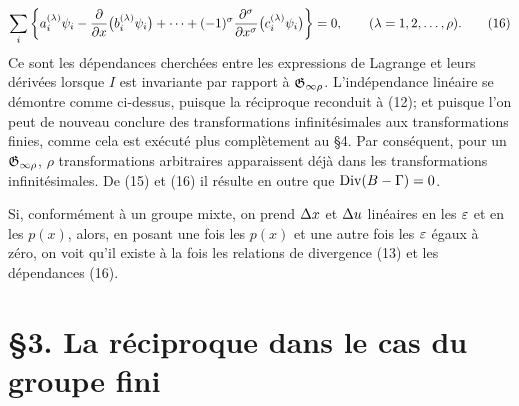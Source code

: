 \begin{equation}
\sum_i\left\{
a_i^{(\lambda)}\psi_i-\frac{\partial}{\partial x}\bigl(b_i^{(\lambda)}\psi_i\bigr)
+\cdots+(-1)^\sigma
\frac{\partial^\sigma}{\partial x^\sigma}\bigl(c_i^{(\lambda)}\psi_i\bigr)
\right\}=0,\qquad(\lambda=1,2,\ldots,\rho).
\tag{16}
\end{equation}
Ce sont les dépendances cherchées entre les expressions de Lagrange et leurs dérivées lorsque \(I\) est invariante par rapport à \(\mathfrak G_{\infty\rho}\). L'indépendance linéaire se démontre comme ci-dessus, puisque la réciproque reconduit à (12); et puisque l'on peut de nouveau conclure des transformations infinitésimales aux transformations finies, comme cela est exécuté plus complètement au \S{}4. Par conséquent, pour un \(\mathfrak G_{\infty\rho}\), \(\rho\) transformations arbitraires apparaissent déjà dans les transformations infinitésimales. De (15) et (16) il résulte en outre que \(\operatorname{Div}(B-\Gamma)=0\).

Si, conformément à un \og{}groupe mixte\fg{}, on prend \(\Delta x\) et \(\Delta u\) linéaires en les \(\varepsilon\) et en les \(p(x)\), alors, en posant une fois les \(p(x)\) et une autre fois les \(\varepsilon\) égaux à zéro, on voit qu'il existe à la fois les relations de divergence (13) et les dépendances (16).

\section*{\S{}3. La réciproque dans le cas du groupe fini}

